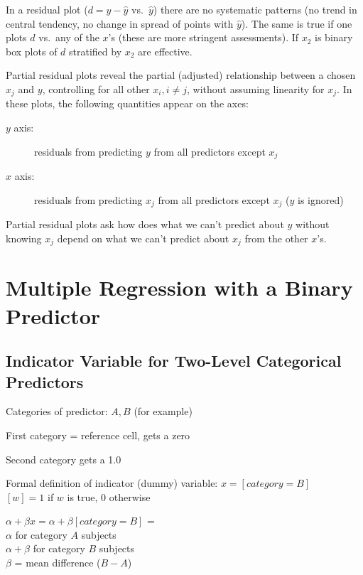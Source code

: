 \item   In a residual plot ($d = y - \hat{y}$ vs.\ $\hat{y}$) there are no
        systematic patterns (no trend in central tendency, no change
        in spread of points with $\hat{y}$).  The same is true if one
        plots $d$ vs.\ any of the $x$'s (these are more stringent
        assessments).  If $x_{2}$ is binary box plots of $d$
        stratified by $x_{2}$ are effective.
\item   Partial residual plots reveal the partial (adjusted)
relationship between a chosen $x_{j}$ and $y$, controlling for all
other $x_{i}, i \neq j$, without assuming linearity for $x_{j}$.  In
these plots, the following quantities appear on the axes:
    \begin{description}
    \item[$y$ axis:] residuals from predicting $y$ from all predictors
        except $x_j$
    \item[$x$ axis:] residuals from predicting $x_j$ from all
        predictors except $x_{j}$ ($y$ is ignored)
    \end{description}
Partial residual plots ask how does what we can't predict about $y$
without knowing $x_j$ depend on what we can't predict about $x_j$ from
the other $x$'s.
\ee
\clearpage

\section{Multiple Regression with a Binary Predictor}
\subsection{Indicator Variable for Two-Level Categorical Predictors}%
\bi
\item Categories of predictor: $A, B$ (for example)
\item First category = reference cell, gets a zero
\item Second category gets a 1.0
\item Formal definition of indicator (dummy) variable: $x = [category=B]$ \\
  $[w]=1$ if $w$ is true, 0 otherwise
\item $\alpha + \beta x = \alpha + \beta [category=B]$ = \\
  $\alpha$ for category $A$ subjects \\
  $\alpha + \beta$ for category $B$ subjects \\
  $\beta$ = mean difference ($B - A$)
\ei

